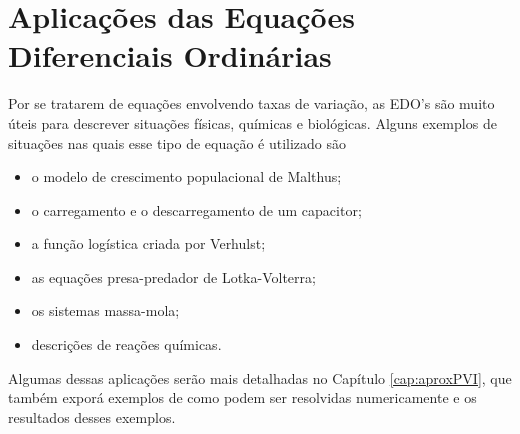         
    \section{Aplicações das Equações Diferenciais Ordinárias}
        
        Por se tratarem de equações envolvendo taxas de variação, as EDO's são muito úteis para descrever situações físicas, químicas e biológicas. Alguns exemplos de situações nas quais esse tipo de equação é utilizado são 
        \begin{itemize}
            \item o modelo de crescimento populacional de Malthus;
            \item o carregamento e o descarregamento de um capacitor;
            \item a função logística criada por Verhulst;
            \item as equações presa-predador de Lotka-Volterra;
            \item os sistemas massa-mola;
            \item descrições de reações químicas.
        \end{itemize}
        
        Algumas dessas aplicações serão mais detalhadas no Capítulo \ref{cap:aproxPVI}, que também exporá exemplos de como podem ser resolvidas numericamente e os resultados desses exemplos.